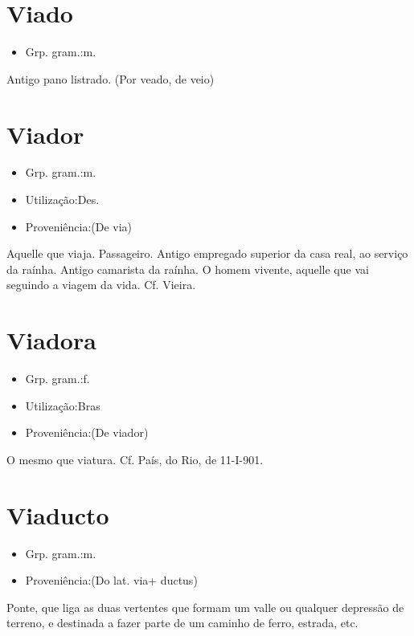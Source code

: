 \documentclass{article}
\begin{document}
\section{Viado}
\begin{itemize}
\item {Grp. gram.:m.}
\end{itemize}
Antigo pano listrado.
(Por \textunderscore veado\textunderscore , de \textunderscore veio\textunderscore )
\section{Viador}
\begin{itemize}
\item {Grp. gram.:m.}
\end{itemize}
\begin{itemize}
\item {Utilização:Des.}
\end{itemize}
\begin{itemize}
\item {Proveniência:(De \textunderscore via\textunderscore )}
\end{itemize}
Aquelle que viaja.
Passageiro.
Antigo empregado superior da casa real, ao serviço da raínha.
Antigo camarista da raínha.
O homem vivente, aquelle que vai seguindo a viagem da vida. Cf. Vieira.
\section{Viadora}
\begin{itemize}
\item {Grp. gram.:f.}
\end{itemize}
\begin{itemize}
\item {Utilização:Bras}
\end{itemize}
\begin{itemize}
\item {Proveniência:(De \textunderscore viador\textunderscore )}
\end{itemize}
O mesmo que \textunderscore viatura\textunderscore . Cf. \textunderscore País\textunderscore , do Rio, de 11-I-901.
\section{Viaducto}
\begin{itemize}
\item {Grp. gram.:m.}
\end{itemize}
\begin{itemize}
\item {Proveniência:(Do lat. \textunderscore via\textunderscore  + \textunderscore ductus\textunderscore )}
\end{itemize}
Ponte, que liga as duas vertentes que formam um valle ou qualquer depressão de terreno, e destinada a fazer parte de um caminho de ferro, estrada, etc.
\end{document}
